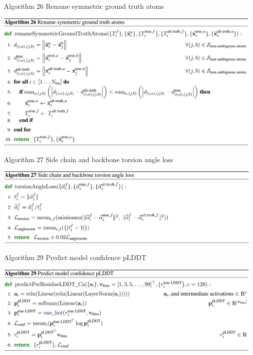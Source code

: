 \documentclass[presentation, smaller]{beamer}
\begin{document}
\begin{frame}[label={sec:org0141bae}]{Algorithm 26 Rename symmetric ground truth atoms \cite{jumperHighlyAccurateProtein2021}}
\begin{center}
\includegraphics[width=.9\linewidth]{./imgs/algo26_rename-truth-atoms.png}
\end{center}
\end{frame}
\begin{frame}[label={sec:orgb3ffb50}]{Algorithm 27 Side chain and backbone torsion angle loss \cite{jumperHighlyAccurateProtein2021}}
\begin{center}
\includegraphics[width=.9\linewidth]{./imgs/algo27_sidechain-backbonetorsion-loss.png}
\end{center}
\end{frame}
\begin{frame}[label={sec:orgebab09d}]{Algorithm 29 Predict model confidence pLDDT \cite{jumperHighlyAccurateProtein2021}}
\begin{center}
\includegraphics[width=.9\linewidth]{./imgs/algo29_confidence-pLDDT.png}
\end{center}
\end{frame}
\end{document}
